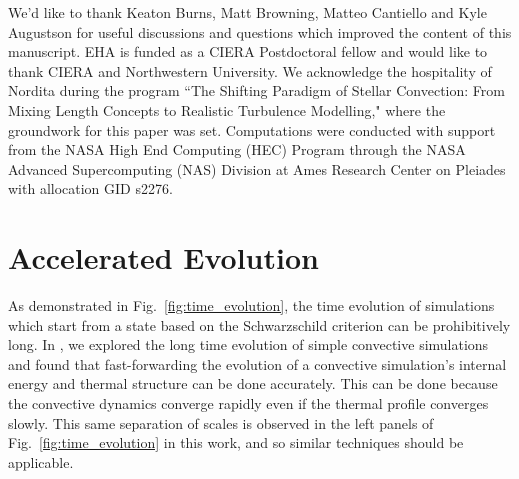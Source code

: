 \documentclass[twocolumn]{aastex631}
\begin{document}
\begin{acknowledgments}
We'd like to thank Keaton Burns, Matt Browning, Matteo Cantiello and Kyle Augustson for useful discussions and questions which improved the content of this manuscript.
EHA is funded as a CIERA Postdoctoral fellow and would like to thank CIERA and Northwestern University. 
We acknowledge the hospitality of Nordita during the program ``The Shifting Paradigm of Stellar Convection: From Mixing Length Concepts to Realistic Turbulence Modelling," where the groundwork for this paper was set.
Computations were conducted with support from the NASA High End Computing (HEC) Program through the NASA Advanced Supercomputing (NAS) Division at Ames Research Center on Pleiades with allocation GID s2276.
\end{acknowledgments}


\appendix

\section{Accelerated Evolution}
\label{app:accelerated_evolution}
As demonstrated in Fig.~\ref{fig:time_evolution}, the time evolution of simulations which start from a state based on the Schwarzschild criterion can be prohibitively long.
In \citet{anders_etal_2018}, we explored the long time evolution of simple convective simulations and found that fast-forwarding the evolution of a convective simulation's internal energy and thermal structure can be done accurately.
This can be done because the convective dynamics converge rapidly even if the thermal profile converges slowly.
This same separation of scales is observed in the left panels of Fig.~\ref{fig:time_evolution} in this work, and so similar techniques should be applicable.
\end{document}
